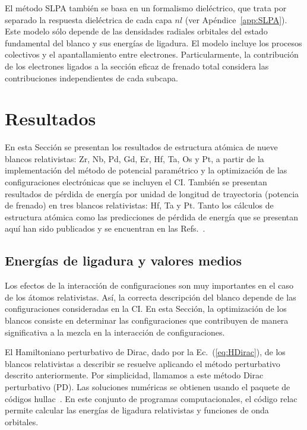 El método SLPA también se basa en un formalismo dieléctrico, que trata 
por separado la respuesta dieléctrica de cada capa $nl$ (ver 
Apéndice~\ref{app:SLPA}). Este modelo sólo depende de las densidades 
radiales orbitales del estado fundamental del blanco y sus energías de 
ligadura. El modelo incluye los procesos colectivos y el apantallamiento 
entre electrones. Particularmente, la contribución de los electrones 
ligados a la sección eficaz de frenado total considera las 
contribuciones independientes de cada subcapa. 

\section{Resultados}
\label{sec:results-heavy}

En esta Sección se presentan los resultados de estructura atómica de 
nueve blancos relativistas: Zr, Nb, Pd, Gd, Er, Hf, Ta, Os y Pt, a 
partir de la implementación del método de potencial paramétrico y la
optimización de las configuraciones electrónicas que se incluyen el CI.
También se presentan resultados de pérdida de energía por unidad de 
longitud de trayectoria (potencia de frenado) en tres blancos 
relativistas: Hf, Ta y Pt. Tanto los cálculos de estructura atómica como 
las predicciones de pérdida de energía que se presentan aquí han sido 
publicados y se encuentran en las 
Refs.~\cite{Mendez:19relat,Montanari:20}. 

\subsection{Energías de ligadura y valores medios}
\label{subsec:results-target}

Los efectos de la interacción de configuraciones son muy importantes en 
el caso de los átomos relativistas. Así, la correcta descripción del 
blanco depende de las configuraciones consideradas en la CI. En esta 
Sección, la optimización de los blancos consiste en determinar las 
configuraciones que contribuyen de manera significativa a la mezcla en 
la interacción de configuraciones. 

El Hamiltoniano perturbativo de Dirac, dado por la Ec.~(\ref{eq:HDirac}), 
de los blancos relativistas a describir se resuelve aplicando el método 
perturbativo descrito anteriormente. Por simplicidad, llamamos a este 
método Dirac perturbativo (PD). Las soluciones numéricas se obtienen 
usando el paquete de códigos {\sc hullac}~\cite{BarShalom:01}. En este 
conjunto de programas computacionales, el código {\sc relac} permite 
calcular las energías de ligadura relativistas y funciones de onda 
orbitales.

